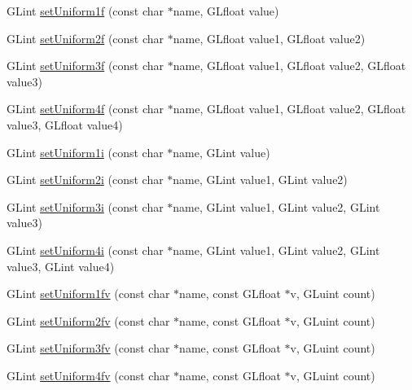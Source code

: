 \begin{DoxyCompactItemize}
G\+Lint \mbox{\hyperlink{classshaderutils_1_1_shader_proxy_ae2a00c93cb2da491f3788364a5bad14a}{set\+Uniform1f}} (const char $\ast$name, G\+Lfloat value)
\item 
G\+Lint \mbox{\hyperlink{classshaderutils_1_1_shader_proxy_a9a1b76e005bbf2c1c071069ea2c16e8b}{set\+Uniform2f}} (const char $\ast$name, G\+Lfloat value1, G\+Lfloat value2)
\item 
G\+Lint \mbox{\hyperlink{classshaderutils_1_1_shader_proxy_a9c74243f8b3f9ea4ec1f7053e296e4bb}{set\+Uniform3f}} (const char $\ast$name, G\+Lfloat value1, G\+Lfloat value2, G\+Lfloat value3)
\item 
G\+Lint \mbox{\hyperlink{classshaderutils_1_1_shader_proxy_a49706cc164facf720ea671819a432d2f}{set\+Uniform4f}} (const char $\ast$name, G\+Lfloat value1, G\+Lfloat value2, G\+Lfloat value3, G\+Lfloat value4)
\item 
G\+Lint \mbox{\hyperlink{classshaderutils_1_1_shader_proxy_add169bd98e695851e04cf6a46c3cc3a1}{set\+Uniform1i}} (const char $\ast$name, G\+Lint value)
\item 
G\+Lint \mbox{\hyperlink{classshaderutils_1_1_shader_proxy_ab9b177faae584cefa917bc598902e7d1}{set\+Uniform2i}} (const char $\ast$name, G\+Lint value1, G\+Lint value2)
\item 
G\+Lint \mbox{\hyperlink{classshaderutils_1_1_shader_proxy_a7464ee4640993975ec29189337364215}{set\+Uniform3i}} (const char $\ast$name, G\+Lint value1, G\+Lint value2, G\+Lint value3)
\item 
G\+Lint \mbox{\hyperlink{classshaderutils_1_1_shader_proxy_a3ec8af1a684b93b897b03e8887b0b222}{set\+Uniform4i}} (const char $\ast$name, G\+Lint value1, G\+Lint value2, G\+Lint value3, G\+Lint value4)
\item 
G\+Lint \mbox{\hyperlink{classshaderutils_1_1_shader_proxy_af0709f94545b3fb4f2f9e525e4c3f06c}{set\+Uniform1fv}} (const char $\ast$name, const G\+Lfloat $\ast$v, G\+Luint count)
\item 
G\+Lint \mbox{\hyperlink{classshaderutils_1_1_shader_proxy_a8681dcd34bcaee0472fdbc836037885f}{set\+Uniform2fv}} (const char $\ast$name, const G\+Lfloat $\ast$v, G\+Luint count)
\item 
G\+Lint \mbox{\hyperlink{classshaderutils_1_1_shader_proxy_a1bfafd1ad1473d2bd5b5f0fb3efe4a83}{set\+Uniform3fv}} (const char $\ast$name, const G\+Lfloat $\ast$v, G\+Luint count)
\item 
G\+Lint \mbox{\hyperlink{classshaderutils_1_1_shader_proxy_af9675dc73014739ef88e0f384e68abfb}{set\+Uniform4fv}} (const char $\ast$name, const G\+Lfloat $\ast$v, G\+Luint count)

\end{DoxyCompactItemize}
